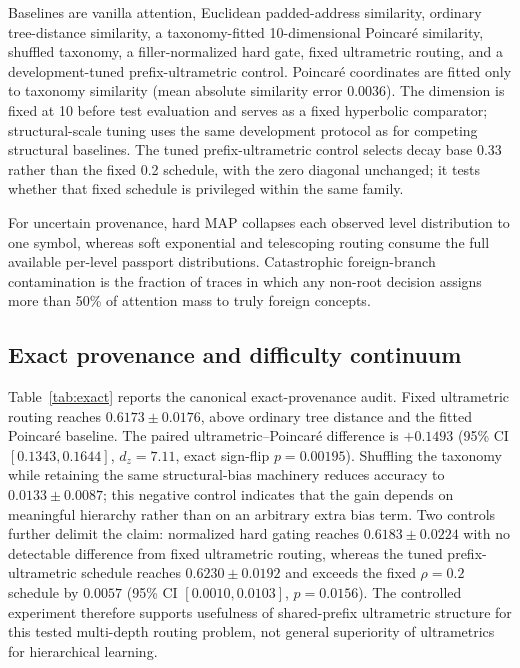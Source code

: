 \documentclass[preprint,11pt]{elsarticle}
\begin{document}
Baselines are vanilla attention, Euclidean padded-address similarity, ordinary tree-distance similarity, a taxonomy-fitted 10-dimensional Poincar\'e similarity, shuffled taxonomy, a filler-normalized hard gate, fixed ultrametric routing, and a development-tuned prefix-ultrametric control. Poincar\'e coordinates are fitted only to taxonomy similarity (mean absolute similarity error 0.0036). The dimension is fixed at 10 before test evaluation and serves as a fixed hyperbolic comparator; structural-scale tuning uses the same development protocol as for competing structural baselines. The tuned prefix-ultrametric control selects decay base 0.33 rather than the fixed 0.2 schedule, with the zero diagonal unchanged; it tests whether that fixed schedule is privileged within the same family.

For uncertain provenance, hard MAP collapses each observed level distribution to one symbol, whereas soft exponential and telescoping routing consume the full available per-level passport distributions. Catastrophic foreign-branch contamination is the fraction of traces in which any non-root decision assigns more than 50\% of attention mass to truly foreign concepts.

\subsection{Exact provenance and difficulty continuum}
Table~\ref{tab:exact} reports the canonical exact-provenance audit. Fixed ultrametric routing reaches $0.6173\pm0.0176$, above ordinary tree distance and the fitted Poincar\'e baseline. The paired ultrametric--Poincar\'e difference is $+0.1493$ (95\% CI $[0.1343,0.1644]$, $d_z=7.11$, exact sign-flip $p=0.00195$). Shuffling the taxonomy while retaining the same structural-bias machinery reduces accuracy to $0.0133\pm0.0087$; this negative control indicates that the gain depends on meaningful hierarchy rather than on an arbitrary extra bias term. Two controls further delimit the claim: normalized hard gating reaches $0.6183\pm0.0224$ with no detectable difference from fixed ultrametric routing, whereas the tuned prefix-ultrametric schedule reaches $0.6230\pm0.0192$ and exceeds the fixed $\rho=0.2$ schedule by $0.0057$ (95\% CI $[0.0010,0.0103]$, $p=0.0156$). The controlled experiment therefore supports usefulness of shared-prefix ultrametric structure for this tested multi-depth routing problem, not general superiority of ultrametrics for hierarchical learning.
\end{document}

